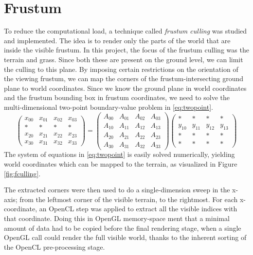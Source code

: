 \section{Frustum}
\label{cha:frustum}
To reduce the computational load, a technique called \textit{frustum culling}
was studied and implemented. The idea is to render only the parts of the
world that are inside the visible frustum.
In this project, the focus of the frustum culling was the terrain and grass.
Since both these are present on the ground level, we can limit the culling
to this plane. By imposing certain restrictions on the orientation of the viewing frustum,
we can map the corners of the frustum-intersecting ground plane to world coordinates.
Since we know the ground plane in world coordinates and the frustum bounding box in
frustum coordinates, we need to solve the multi-dimensional two-point boundary-value problem in \eqref{eq:twopoint}.
\begin{equation}
    \label{eq:twopoint}
    \left(
\begin{array}{cccc}
x_{00} & x_{01} & x_{02} & x_{03} \\
* & * & * & * \\
x_{20} & x_{21} & x_{22} & x_{23} \\
x_{30} & x_{31} & x_{32} & x_{33}
\end{array}
\right ) =
\left(
\begin{array}{cccc}
A_{00} & A_{01} & A_{02} & A_{03} \\
A_{10} & A_{11} & A_{12} & A_{13} \\
A_{20} & A_{21} & A_{22} & A_{23} \\
A_{30} & A_{31} & A_{32} & A_{33}
\end{array}
\right )
\left(
\begin{array}{cccc}
* & * & * & * \\
y_{10} & y_{11} & y_{12} & y_{13} \\
* & * & * & * \\
* & * & * & *
\end{array}
\right )
\end{equation}
The system of equations in \eqref{eq:twopoint} is easily solved numerically,
yielding world coordinates which can be mapped to the terrain, as visualized in Figure \ref{fig:fculling}.

The extracted corners were then used to do a single-dimension sweep in the x-axis; from the leftmost corner of the visible terrain, to the rightmost.
For each x-coordinate, an OpenCL step was applied to extract all the visible indices with that coordinate.
Doing this in OpenGL memory-space ment that a minimal amount of data had to be copied before the
final rendering stage, when a single OpenGL call could render the full visible world, thanks to
the inherent sorting of the OpenCL pre-processing stage.
